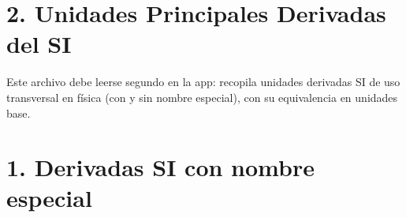 \documentclass[11pt,a4paper]{article}
\begin{document}
\section*{2. Unidades Principales Derivadas del SI}

Este archivo debe leerse segundo en la app: recopila unidades derivadas SI de uso transversal en física (con y sin nombre especial), con su equivalencia en unidades base.

\section*{1. Derivadas SI con nombre especial}

\scriptsize
\end{document}
